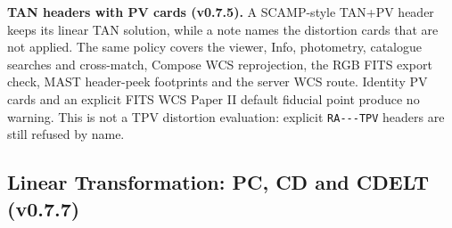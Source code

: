 \documentclass[11pt,a4paper]{article}
\newcommand{\code}[1]{\texttt{\small #1}}
\begin{document}
    \textbf{TAN headers with PV cards (v0.7.5).} A SCAMP-style TAN+PV header keeps its linear TAN solution, while a note names the distortion cards that are not applied. The same policy covers the viewer, Info, photometry, catalogue searches and cross-match, Compose WCS reprojection, the RGB FITS export check, MAST header-peek footprints and the server WCS route. Identity PV cards and an explicit FITS WCS Paper II default fiducial point produce no warning. This is not a TPV distortion evaluation: explicit \code{RA-{}-{}-TPV} headers are still refused by name.

    \subsection{Linear Transformation: PC, CD and CDELT (v0.7.7)}
    \label{sec:wcs_precedence}
\end{document}
